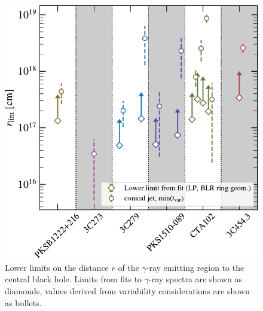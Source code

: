 \documentclass[twocolumn,linenumbers]{aastex62}
\newcommand{\gray}{$\gamma$-ray\xspace}
\begin{document}
\begin{figure}
    \centering
    \includegraphics[width = .9\linewidth]{limits.pdf}
    \caption{Lower limits on the distance $r$ of the \gray emitting region to the central black hole. Limits from fits to \gray spectra are shown as diamonds, values derived from variability considerations are shown as bullets. }
    \label{fig:blr_limits}
\end{figure}
\end{document}
